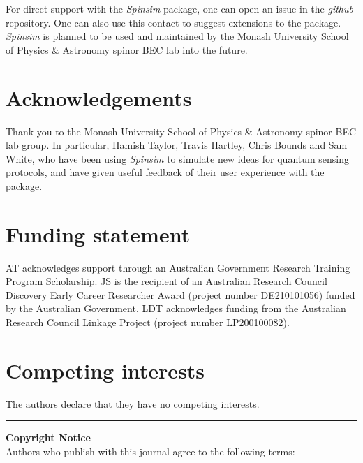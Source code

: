 \documentclass{jors}
\begin{document}
		For direct support with the \emph{Spinsim} package, one can open an issue in the \emph{github} repository.
		One can also use this contact to suggest extensions to the package.
		\emph{Spinsim} is planned to be used and maintained by the Monash University School of Physics \& Astronomy spinor BEC lab into the future.

\section{Acknowledgements}

Thank you to the Monash University School of Physics \& Astronomy spinor BEC lab group. In particular, Hamish Taylor, Travis Hartley, Chris Bounds and Sam White, who have been using \emph{Spinsim} to simulate new ideas for quantum sensing protocols, and have given useful feedback of their user experience with the package.

\section{Funding statement}

AT acknowledges support through an Australian Government Research Training Program Scholarship.
JS is the recipient of an Australian Research Council Discovery Early Career Researcher Award (project number DE210101056) funded by the Australian Government.
LDT acknowledges funding from the Australian Research Council Linkage Project (project number LP200100082).

\section{Competing interests}

The authors declare that they have no competing interests.

{}


\vspace{2cm}

\rule{\textwidth}{1pt}

{ \bf Copyright Notice} \\
Authors who publish with this journal agree to the following terms: \\
\end{document}
